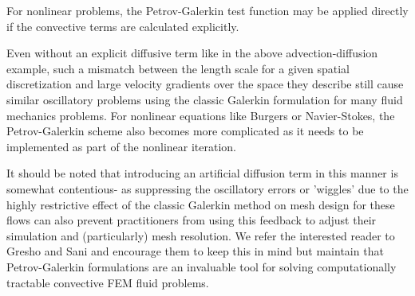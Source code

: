 
For nonlinear problems, the Petrov-Galerkin test function may be applied directly if the convective terms are calculated explicitly. 

Even without an explicit diffusive term like in the above advection-diffusion example, such a mismatch between the length scale for a given spatial discretization and large velocity gradients over the space they describe still cause similar oscillatory problems using the classic Galerkin formulation for many fluid mechanics problems. For nonlinear equations like Burgers or Navier-Stokes, the Petrov-Galerkin scheme also becomes more complicated as it needs to be implemented as part of the nonlinear iteration. 

It should be noted that introducing an artificial diffusion term in this manner is somewhat contentious- as suppressing the oscillatory errors or 'wiggles' due to the highly restrictive effect of the classic Galerkin method on mesh design for these flows can also prevent practitioners from using this feedback to adjust their simulation and (particularly) mesh resolution. We refer the interested reader to Gresho and Sani and encourage them to keep this in mind but maintain that Petrov-Galerkin formulations are an invaluable tool for solving computationally tractable convective FEM fluid problems.


